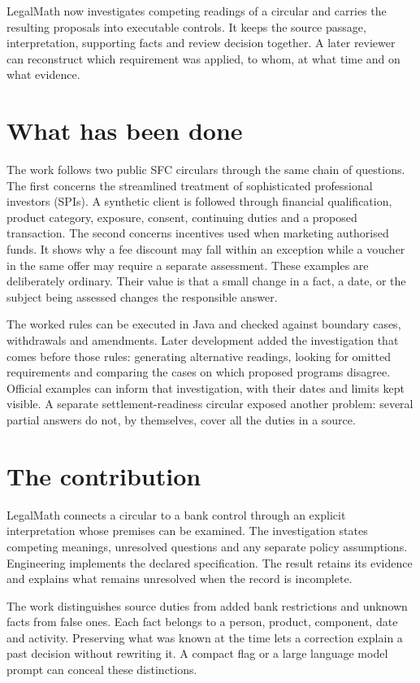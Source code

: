 \documentclass[12pt,a4paper,oneside,openany]{book}
\begin{document}
LegalMath now investigates competing readings of a circular and carries the
resulting proposals into executable controls. It keeps the source passage,
interpretation, supporting facts and review decision together. A later reviewer
can reconstruct which requirement was applied, to whom, at what time and on what
evidence.

\section*{What has been done}

The work follows two public SFC circulars through the same chain of questions.
The first concerns the streamlined treatment of sophisticated professional
investors (SPIs). A synthetic client is followed through financial qualification,
product category, exposure, consent, continuing duties and a proposed
transaction. The second concerns incentives used when marketing authorised
funds. It shows why a fee discount may fall within an exception while a voucher
in the same offer may require a separate assessment. These examples are
deliberately ordinary. Their value is that a small change in a fact, a date, or
the subject being assessed changes the responsible answer.

The worked rules can be executed in Java and checked against boundary cases,
withdrawals and amendments. Later development added the investigation that comes
before those rules: generating alternative readings, looking for omitted
requirements and comparing the cases on which proposed programs disagree.
Official examples can inform that investigation, with their dates and limits
kept visible. A separate settlement-readiness circular exposed another problem:
several partial answers do not, by themselves, cover all the duties in a source.

\section*{The contribution}

LegalMath connects a circular to a bank control through an explicit
interpretation whose premises can be examined. The investigation states
competing meanings, unresolved questions and any separate policy assumptions.
Engineering implements the declared specification. The result retains its
evidence and explains what remains unresolved when the record is incomplete.

\newpage
The work distinguishes source duties from added bank restrictions and unknown
facts from false ones. Each fact belongs to a person, product, component, date
and activity. Preserving what was known at the time lets a correction explain
a past decision without rewriting it. A compact flag or a large language model
prompt can conceal these distinctions.
\end{document}
